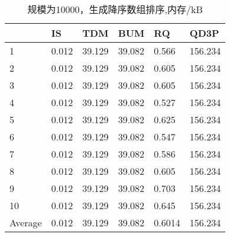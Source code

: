 \documentclass[12pt,a4paper]{ctexart}
\begin{document}
\begin{table}[H]
    \setlength{\abovecaptionskip}{0cm}
    \setlength{\belowcaptionskip}{0.5cm}
    \small
    \centering
    \caption[short]{规模为10000，生成降序数组排序,内存/kB}
    \begin{tabular}{|l|l|l|l|l|l|}
        \hline
                & IS    & TDM    & BUM    & RQ     & QD3P    \\ \hline
        1       & 0.012 & 39.129 & 39.082 & 0.566  & 156.234 \\ \hline
        2       & 0.012 & 39.129 & 39.082 & 0.605  & 156.234 \\ \hline
        3       & 0.012 & 39.129 & 39.082 & 0.605  & 156.234 \\ \hline
        4       & 0.012 & 39.129 & 39.082 & 0.527  & 156.234 \\ \hline
        5       & 0.012 & 39.129 & 39.082 & 0.625  & 156.234 \\ \hline
        6       & 0.012 & 39.129 & 39.082 & 0.547  & 156.234 \\ \hline
        7       & 0.012 & 39.129 & 39.082 & 0.586  & 156.234 \\ \hline
        8       & 0.012 & 39.129 & 39.082 & 0.605  & 156.234 \\ \hline
        9       & 0.012 & 39.129 & 39.082 & 0.703  & 156.234 \\ \hline
        10      & 0.012 & 39.129 & 39.082 & 0.645  & 156.234 \\ \hline
        Average & 0.012 & 39.129 & 39.082 & 0.6014 & 156.234 \\ \hline
    \end{tabular}
\end{table}
\end{document}
